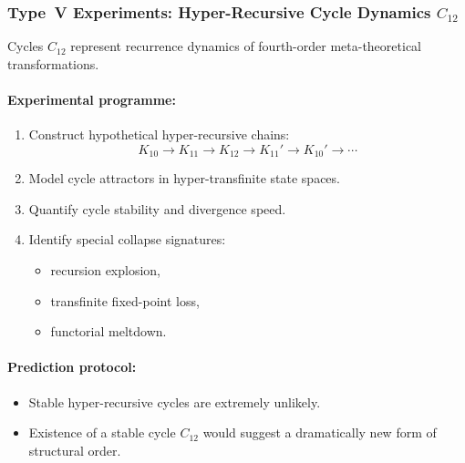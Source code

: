 \subsubsection{Type~V Experiments: Hyper-Recursive Cycle Dynamics $C_{12}$}

Cycles $C_{12}$ represent recurrence dynamics of fourth-order 
meta-theoretical transformations.

\paragraph{Experimental programme:}

\begin{enumerate}
    \item Construct hypothetical hyper-recursive chains:
          \[
              K_{10} \rightarrow K_{11} \rightarrow K_{12} 
                \rightarrow K_{11}' \rightarrow K_{10}' 
                \rightarrow \cdots
          \]
    \item Model cycle attractors in hyper-transfinite state spaces.
    \item Quantify cycle stability and divergence speed.
    \item Identify special collapse signatures:
          \begin{itemize}
              \item recursion explosion,
              \item transfinite fixed-point loss,
              \item functorial meltdown.
          \end{itemize}
\end{enumerate}

\paragraph{Prediction protocol:}

\begin{itemize}
    \item Stable hyper-recursive cycles are extremely unlikely.
    \item Existence of a stable cycle $C_{12}$ would suggest a 
          dramatically new form of structural order.
\end{itemize}



